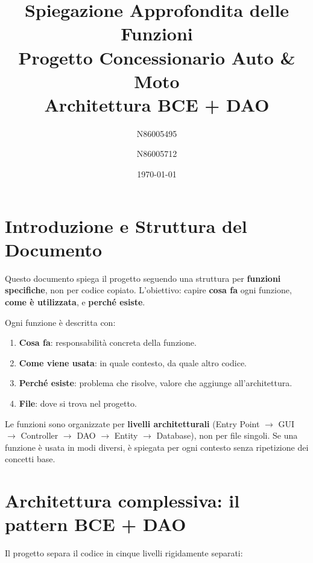 \documentclass[12pt,a4paper]{article}
\title{Spiegazione Approfondita delle Funzioni\\Progetto Concessionario Auto \& Moto\\Architettura BCE + DAO}
\author{N86005495 \and N86005712}
\date{\today}
\begin{document}
\maketitle
\newpage
\tableofcontents
\newpage

\section{Introduzione e Struttura del Documento}

Questo documento spiega il progetto seguendo una struttura per \textbf{funzioni specifiche}, non per codice copiato.
L'obiettivo: capire \textbf{cosa fa} ogni funzione, \textbf{come è utilizzata}, e \textbf{perché esiste}.

Ogni funzione è descritta con:
\begin{enumerate}
  \item \textbf{Cosa fa}: responsabilità concreta della funzione.
  \item \textbf{Come viene usata}: in quale contesto, da quale altro codice.
  \item \textbf{Perché esiste}: problema che risolve, valore che aggiunge all'architettura.
  \item \textbf{File}: dove si trova nel progetto.
\end{enumerate}

Le funzioni sono organizzate per \textbf{livelli architetturali} (Entry Point $\to$ GUI $\to$ Controller $\to$ DAO $\to$ Entity $\to$ Database), non per file singoli.
Se una funzione è usata in modi diversi, è spiegata per ogni contesto senza ripetizione dei concetti base.

\section{Architettura complessiva: il pattern BCE + DAO}

Il progetto separa il codice in cinque livelli rigidamente separati:
\end{document}
